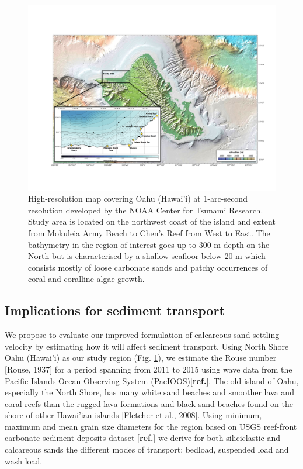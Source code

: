 \documentclass[9pt,twocolumn,twoside]{pnas-new}
\begin{document}
\cleardoublepage

\begin{figure}%
\centering
\includegraphics[width=17.8cm]{fig1}
\caption{High-resolution map covering Oahu (Hawai'i) at 1-arc-second resolution developed by the NOAA Center for Tsunami Research. Study area is located on the northwest coast of the island and extent from Mokuleia Army Beach to Chen's Reef from West to East. The bathymetry in the region of interest goes up to 300 m depth on the North but is characterised by a shallow seafloor below 20 m which consists mostly of loose carbonate sands and patchy occurrences of coral and coralline algae growth.}
\label{fig:oahu}
\end{figure}

\subsection*{Implications for sediment transport}

We propose to evaluate our improved formulation of calcareous sand settling velocity by estimating how it will affect sediment transport. Using North Shore Oahu (Hawai'i) as our study region (Fig. \ref{fig:oahu}), we estimate the Rouse number [Rouse, 1937] for a period spanning from 2011 to 2015 using wave data from the Pacific Islands Ocean Observing System (PacIOOS)[\textbf{ref.}]. The old island of Oahu, especially the North Shore, has many white sand beaches and smoother lava and coral reefs than the rugged lava formations and black sand beaches found on the shore of other Hawai'ian islands [Fletcher et al., 2008]. Using minimum, maximum and mean grain size diameters for the region based on USGS reef-front carbonate sediment deposits dataset [\textbf{ref.}] we derive for both siliciclastic and calcareous sands the different modes of transport: bedload, suspended load and wash load.   
\end{document}
